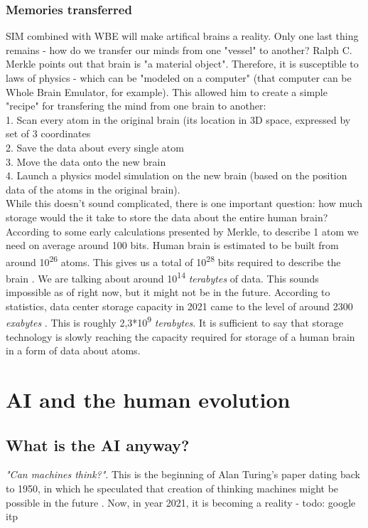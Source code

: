 \documentclass[12pt]{article}
\begin{document}
\subsubsection{Memories transferred}
	SIM combined with WBE will make artifical brains a reality. Only one last thing remains - how do we transfer our minds from one "vessel" to another? Ralph C. Merkle points out that brain is "a material object". Therefore, it is susceptible to laws of physics - which can be "modeled on a computer" \cite{uploading:1} (that computer can be Whole Brain Emulator, for example). This allowed him to create a simple "recipe" for transfering the mind from one brain to another:\\1. Scan every atom in the original brain (its location in 3D space, expressed by set of 3 coordinates
	\\2. Save the data about every single atom\\3. Move the data onto the new brain\\4. Launch a physics model simulation on the new brain (based on the position data of the atoms in the original brain)\cite{uploading:1}.\\While this doesn't sound complicated, there is one important question: how much storage would the it take to store the data about the entire human brain? 
	\\According to some early calculations presented by Merkle, to describe 1 atom we need on average around 100 bits. Human brain is estimated to be built from around 10\textsuperscript{26} atoms. This gives us a total of 10\textsuperscript{28} bits required to describe the brain \cite{uploading:1}. We are talking about around 10\textsuperscript{14} \emph{terabytes} of data. This sounds impossible as of right now, but it might not be in the future. According to statistics, data center storage capacity in 2021 came to the level of around 2300 \emph{exabytes} \cite{statista:capacity}. This is roughly 2,3*10\textsuperscript{9} \emph{terabytes}. It is sufficient to say that storage technology is slowly reaching the capacity required for storage of a human brain in a form of data about atoms.\\


\section{AI and the human evolution}
\subsection{What is the AI anyway?}
	\emph{"Can machines think?"}. This is the beginning of Alan Turing's paper dating back to 1950, in which he speculated that creation of thinking machines might be possible in the future \cite{turing}. Now, in year 2021, it is becoming a reality - todo: google itp
\end{document}
